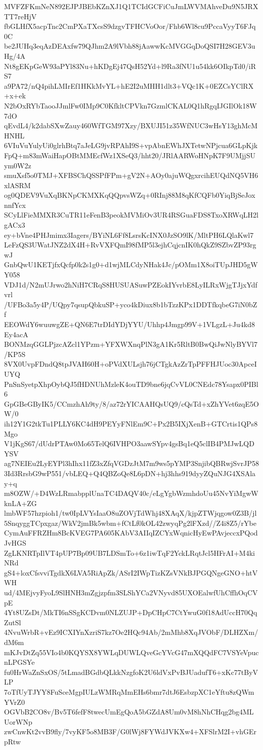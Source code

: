 MVFZFKmNeN892EJPJBEbKZnXJ1Q1TCIdGCFiCuJmLWVMAhveDu9N5JRXTT7reHjV
fbGLHfX5acpTnc2CmPXaTXcsS9dzgvTFHCVoOor/Fhb6Wl8cu9PccaVyyT6FJq0C
be2JUHq3eqAzDEAxfw79QJhm2A9lVbh88jAawwKcMVGGqDoQSI7H28GEV3uHg/4A
Nt8gEKpGeW93aPYl83Nu+hKDgEj47QsH52Yd+l9Ra3fNU1u54kk6OIkpTd0/iRS7
a9PA72/nQ4pihLMIrEf1HKkMvYL+hE2I2uMHH1dlt3+VQc1K+0EZCsYClRX+x+ek
N2bOxRYbTaooJJmlFw0IMp9C0KfkltCPVkn7GzmlCKAL0Q1hRgqIJGIlOk18W7dO
qEvdL4/k2dabSXwZauy460WfTGM97Xzy/BXUJI51z35WfNUC3wHsY13ghMcMHNHL
6VIuVuYulyUi0glrhBtq7aJeLG9jvRPAhI9S+vpAbnEWhJXTetwNPjcua6GLpKjk
FpQ+m83mWaiHapOBtMMEcfWz1XSeQ3/hht20/JRlAARWoHNpK7F9UMjjSUym0W2z
smuXsf5o0TMJ+XFBSChQSSPfFPm+gV2N+AOy0ajuWQgxrcihEUQdNQ5VH6xlASRM
og0QDEV9VuXqBKNpCKMXKqQQpvsWZq+0RInj88M8qKfCQFb0YiqBjSeJoxnnfYcx
SCyLlFieMMXR3CuTR11eFenB3peokMVMiOv3UR4RSGuaFDS8TxoXRWqLH2lgACx3
ey+bVne4PHJmimx3Iagers/BYiNL6Ff8LsrsKcINX0JzSO9lK/MltPH6LQlaKwl7
LeFzQS3UWatJNZ2dX4H+RvVXFQmI98fMP5l3ejhCqjcnIK0hQkZ9SZbvZP93rgwJ
GnbQwU1KETjfxQcfp0k2s1g0+d1wjMLCdyNHak4Jc/pOMm1X8oiTUpJHD5gWY058
VDJ1d/N2mUJrwo2hNiH7CRqS8HUSUASuwPZEokIYvrbE8LyILRxWjgTJjxYdfvrl
/UFBo3a5y4P/UQpy7qsupQbkuSP+yco4kDiux8b1bTzzKPx1DDTfkqbeG7iN0bZf
EEOWdY6wuuwgZE+QN6E7trDIdYDjYYU/Uhhp4Jmgp99V+1VLgzL+Ju4kd8Ey4acA
BONMzqGGLPjzcAZcl1YPzm+YFXWXnqPlN3gA1Kr5RltB0BwQiJwNlyBYVl7/KP5S
8VX0UvpFDndQ8tpJVAH60H+oPVdXULsjh76jCTgkAzZrTpPFFHJUoc30ApceIUYQ
PnSnSyetpXhpOybQJ5fHDNUhMzleK4ouTD9bne6jqCvVL0CNEdc78Ysapx0PIBl6
GpGBeGByIK5/CCmzhAh9ty/8/az72rYICAAHQsUQ9/cQsTd+xZhYVet6zqE5OW/0
ih12Y1G2tkTu1PLLY6KC4dH9PEYyFNlEm9C+Px2B5IXjXenB+GTCrtis1QPs8Mgo
V1jKgS67/dUdrPTAw0Mo65TelQ6IVHPO3aawSYpv4gsBq1eQ5clIB4PMJwLQDYSV
ag7NEIEu2LyEYPl3hIhx11fZ3xZfqVGDzJtM7m9ws5pYMP3SnjibQBRwjSvrJP58
3Id3RrsbG9wP551/vbLEQ+Q4QBZoQe8L6pDN+hj3hhs919dyyZQuNJG4XSAlay+q
m8OZW/+D4WzLRmabpplUnaTC4DAQV40c/eLgYgbWzmhdoUu45NvYiMgwWknLA+ZG
lmbWF57hzpioh1/tw0IpLVYsIaaO8uZOVjTdWhj48XAqX/kjpZTWjqgow0Z3B/jl
5SnqyggTCpxgaz/WkV2jmBk5wbm+fCtLf0kOL42zwyqPg2lFXzd//Z4i8Z5/rYbe
CymAuFFRZHm8BcKVEG7PA605KAbV3AIIqIZCYxWqnicHyEwPAvjeccxPQodJvHGS
ZgLKNRTpIlVT4pUP7Bp09UB7LDSmTo+6z1iwTqF2YckLRqtJcl5HFrAI+M4kiNRd
gS4+loxCfsvviTgdkX6LVA5RiApZk/ASrI2IWpTizKZsVNkBJPGQNgeGNO+htVWH
ud/4MEjvyFyoL9SlHNH3mZgjzpfm3SLShYCa2VNyvd85UXOEalwfUhCffhOqCVpE
4Yt8UZsDt/MkTI6nSSgKCDvm0NLZUJP+DpCHpC7CtYwuG0f18AdUccH70QqZutSl
4NvuWrbR+vEz9ICXIYnXzriS7kz7Oe2HQc94Ab/2mMhb8XqJVObF/DLHZXm/dM6m
mKJvDtZq55VIo4b0KQYSX8YWLqDUWLQveGcYVcG47mXQQdFC7VSYeVpucnLPGSYe
fu0HrWaZnSxOS/5tLmadBGdbQLkkNzgfoK2U6ldVxPvBJUadufT6+xKc77tByVLP
7oTfUyTJYY8FuSceMgpIULzWMRqMmEHs6bmr7dtJ6EsbzpXC1eYftu8zQWmYVrZ0
OGVbB2CO8v/Bv5T6fefF8twecUmEgQoA5bGZdA8Um0vM8hNhCHqg2bg4MLUorWNp
zwCnwKt2vvB9fly/7vyKF5o8MB3F/G0lWj8FYWdJVKXw4+XFSlrM2I+vhGErpRtw
